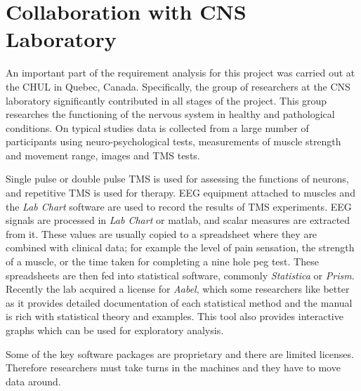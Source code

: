 
\section{Collaboration with CNS Laboratory}

An important part of the requirement analysis for this project was carried out at the CHUL in Quebec, Canada. Specifically, the group of researchers at the CNS laboratory significantly contributed in all stages of the project. This group researches the functioning of the nervous system in healthy and pathological conditions. On typical studies data is collected from a large number of participants using neuro-psychological tests, measurements of muscle strength and movement range, images and TMS tests. 

Single pulse or double pulse TMS is used for assessing the functions of neurons, and repetitive TMS is used for therapy. EEG equipment attached to muscles and the \emph{Lab Chart} software are used to record the results of TMS experiments. EEG signals are processed in \emph{Lab Chart} or matlab, and scalar measures are extracted from it. These values are usually  copied to a spreadsheet where they are combined with clinical data; for example the level of pain sensation, the strength of a muscle, or the time taken for completing a nine hole peg test. These spreadsheets are then fed into statistical software, commonly \emph{Statistica} or \emph{Prism}. Recently the lab acquired a license for \emph{Aabel}, which some researchers like better as it provides detailed documentation of each statistical method and the manual is  rich with statistical theory and examples. This tool also provides interactive graphs which can be used for exploratory analysis. 

Some of the key software packages are proprietary and there are limited licenses. Therefore researchers must take turns in the machines and they have to move data around.



 


